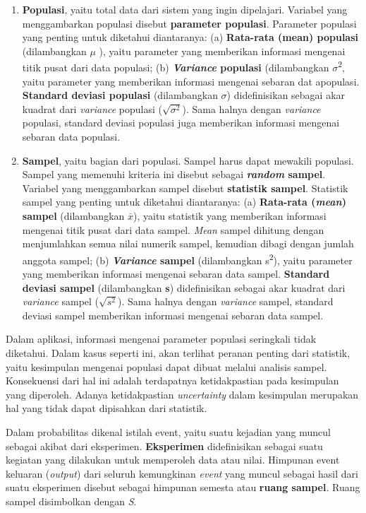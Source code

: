 \documentclass[
]{book}
\providecommand{\tightlist}{%
  \setlength{\itemsep}{0pt}\setlength{\parskip}{0pt}}
\begin{document}
\begin{enumerate}
\def\labelenumi{\arabic{enumi}.}
\tightlist
\item
  \textbf{Populasi}, yaitu total data dari sistem yang ingin dipelajari. Variabel yang menggambarkan populasi disebut \textbf{parameter populasi}. Parameter populasi yang penting untuk diketahui diantaranya: (a) \textbf{Rata-rata (mean) populasi} (dilambangkan \(\mu\) ), yaitu parameter yang memberikan informasi mengenai titik pusat dari data populasi; (b) \textbf{\emph{Variance} populasi} (dilambangkan \(\sigma\)\textsuperscript{2}, yaitu parameter yang memberikan informasi mengenai sebaran dat apopulasi. \textbf{Standard deviasi populasi} (dilambangkan \(\sigma\)) didefinisikan sebagai akar kuadrat dari \emph{variance} populasi (\(\sqrt{\sigma^2}\)). Sama halnya dengan \emph{variance} populasi, standard deviasi populasi juga memberikan informasi mengenai sebaran data populasi.
\item
  \textbf{Sampel}, yaitu bagian dari populasi. Sampel harus dapat mewakili populasi. Sampel yang memenuhi kriteria ini disebut sebagai \textbf{\emph{random} sampel}. Variabel yang menggambarkan sampel disebut \textbf{statistik sampel}. Statistik sampel yang penting untuk diketahui diantaranya: (a) \textbf{Rata-rata (\emph{mean}) sampel} (dilambangkan \(\bar{x}\)), yaitu statistik yang memberikan informasi mengenai titik pusat dari data sampel. \emph{Mean} sampel dihitung dengan menjumlahkan semua nilai numerik sampel, kemudian dibagi dengan jumlah anggota sampel; (b) \textbf{\emph{Variance} sampel} (dilambangkan s\textsuperscript{2}), yaitu parameter yang memberikan informasi mengenai sebaran data sampel. \textbf{Standard deviasi sampel} (dilambangkan \textbf{s}) didefinisikan sebagai akar kuadrat dari \emph{variance} sampel (\(\sqrt{s^2}\)). Sama halnya dengan \emph{variance} sampel, standard deviasi sampel memberikan informasi mengenai sebaran data sampel.
\end{enumerate}

Dalam aplikasi, informasi mengenai parameter populasi seringkali tidak diketahui. Dalam kasus seperti ini, akan terlihat peranan penting dari statistik, yaitu kesimpulan mengenai populasi dapat dibuat melalui analisis sampel. Konsekuensi dari hal ini adalah terdapatnya ketidakpastian pada kesimpulan yang diperoleh. Adanya ketidakpastian \emph{uncertainty} dalam kesimpulan merupakan hal yang tidak dapat dipisahkan dari statistik.

Dalam probabilitas dikenal istilah event, yaitu suatu kejadian yang muncul sebagai akibat dari eksperimen. \textbf{Eksperimen} didefinisikan sebagai suatu kegiatan yang dilakukan untuk memperoleh data atau nilai. Himpunan event keluaran (\emph{output}) dari seluruh kemungkinan \emph{event} yang muncul sebagai hasil dari suatu eksperimen disebut sebagai himpunan semesta atau \textbf{ruang sampel}. Ruang sampel disimbolkan dengan \emph{S}.
\end{document}
